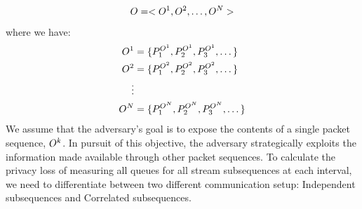 \begin{equation}
  O = <O^1, O^2, \dots, O^N>
\end{equation}
\noindent 
where we have:
\begin{align*}
  O^1 &= \{{P^{O^1}_1}, {P^{O^1}_2}, {P^{O^1}_3}, \dots \} \\
  O^2 &= \{{P^{O^2}_1}, {P^{O^2}_2}, {P^{O^2}_3}, \dots \} \\
  \vdots& \\
  O^N &= \{{P^{O^N}_1}, {P^{O^N}_2}, {P^{O^N}_3}, \dots \} 
\end{align*} 
We assume that the adversary's goal is to expose the contents of a single packet sequence, $O^k$.
In pursuit of this objective, the adversary strategically exploits the information made available through other packet sequences.
To calculate the privacy loss of measuring all queues for all stream subsequences at each interval, we need to differentiate between two different communication setup: Independent subsequences and Correlated subsequences.   

